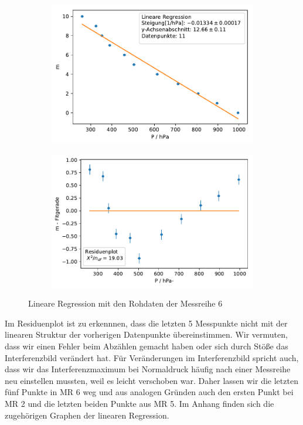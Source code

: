 \documentclass[12pt,a4paper]{article}
\begin{document}
\begin{figure}[H]
	\centering
	\begin{subfigure}{0.49\textwidth}
		\centering
		\includegraphics[width=\textwidth]{Python/MR6_LinReg_Rohdaten.pdf}
	\end{subfigure}
	\begin{subfigure}{0.49\textwidth}
		\centering
		\includegraphics[width=\textwidth]{Python/MR6_Residuen_Rohdaten.pdf}
	\end{subfigure}
	\caption{Lineare Regression mit den Rohdaten der Messreihe 6}
	\label{MR6_Rohdaten}
\end{figure}
Im Residuenplot ist zu erkennnen, dass die letzten 5 Messpunkte nicht mit der linearen Struktur der vorherigen Datenpunkte übereinstimmen. Wir vermuten, dass wir einen Fehler beim Abzählen gemacht haben oder sich durch Stöße das Interferenzbild verändert hat. Für Veränderungen im Interferenzbild spricht auch, dass wir das Interferenzmaximum bei Normaldruck häufig nach einer Messreihe neu einstellen mussten, weil es leicht verschoben war. Daher lassen wir die letzten fünf Punkte in MR 6 weg und aus analogen Gründen auch den ersten Punkt bei MR 2 und die letzten beiden Punkte aus MR 5. Im Anhang finden sich die zugehörigen Graphen der linearen Regression.\\
\end{document}
